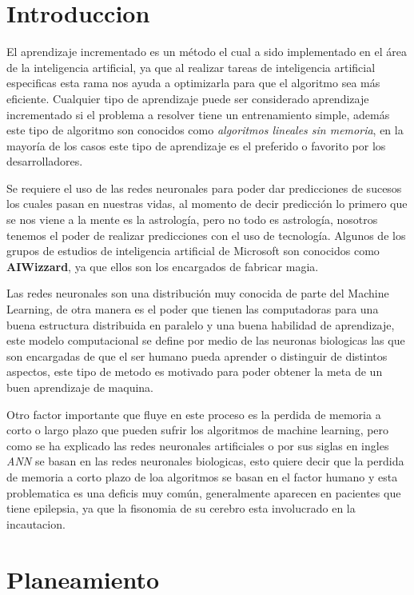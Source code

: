 \section{Introduccion}

El aprendizaje incrementado es un método el cual a sido implementado en el área de la inteligencia artificial, ya que al realizar tareas de inteligencia artificial especificas esta rama nos 
ayuda a optimizarla para que el algoritmo sea más eficiente.
Cualquier tipo de aprendizaje puede ser considerado aprendizaje incrementado si el problema a resolver tiene un entrenamiento simple, adem\'as este tipo de algoritmo son conocidos como \textit{algoritmos lineales sin memoria},
en la mayor\'ia de los casos este tipo de aprendizaje es el preferido o favorito por los desarrolladores. \cite{GiraudCarrier2000}

Se requiere el uso de las redes neuronales para poder dar predicciones de sucesos los cuales pasan en nuestras vidas, al momento de decir predicción lo primero que se 
nos viene a la mente es la astrología, pero no todo es astrología, nosotros tenemos el poder de realizar predicciones con el uso de tecnología. Algunos de los grupos de estudios de inteligencia artificial de Microsoft
son conocidos como \textbf{AIWizzard}, ya que ellos son los encargados de fabricar magia.

Las redes neuronales son una distribuci\'on muy conocida de parte del Machine Learning, de otra manera es el poder que tienen las computadoras para una buena estructura distribuida en paralelo y una buena habilidad de aprendizaje, 
este modelo computacional se define por medio de las neuronas biologicas las que son encargadas de que el ser humano pueda aprender o distinguir de distintos aspectos, este tipo de 
metodo es motivado para poder obtener la meta de un buen aprendizaje de maquina. \cite{liu2015}

Otro factor importante que fluye en este proceso es la perdida de memoria a corto o largo plazo que pueden sufrir los algoritmos de machine learning, pero como se ha explicado las redes neuronales artificiales o por sus siglas en ingles 
\textit{ANN} se basan en las redes neuronales biologicas, esto quiere decir que la perdida de memoria a corto plazo de loa algoritmos se basan en el factor humano y esta problematica es una deficis muy com\'un, generalmente aparecen en pacientes
que tiene epilepsia, ya que la fisonomia de su cerebro esta involucrado en la incautacion. \cite{TRAMONINEGRE2017}

\section{Planeamiento}

